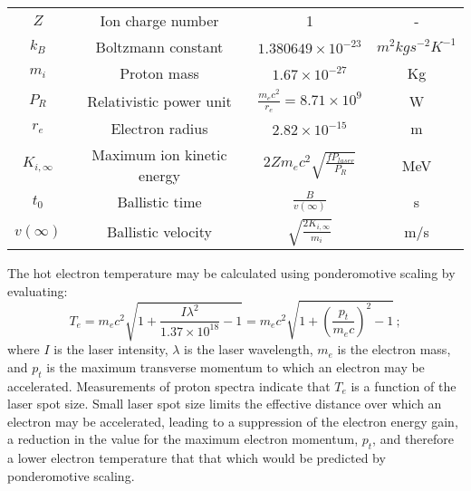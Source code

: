 \begin{table}
\begin{center}
\begin{tabular}{c c c c}
      $Z$ & Ion charge number & 1 & - \\  
      $k_{B}$ & Boltzmann constant & $1.380649 \times 10^{-23}$ & $m^{2} kg s^{-2} K^{-1}$ \\  
      $m_{i}$ & Proton mass & $1.67 \times 10^{-27}$ & Kg \\ 
      $P_{R}$ & Relativistic power unit & $\frac{m_{e} c^{2}}{r_{e}} = 8.71 \times 10^{9}$ & W \\  
      $r_{e}$ & Electron radius & $2.82 \times 10^{-15}$ & m \\  
      $K_{i,\infty}$ & Maximum ion kinetic energy & $2 Z m_{e} c^{2} \sqrt{\frac{f P_{laser}}{P_{R}}}$ & MeV \\  
      $t_{0}$ & Ballistic time & $\frac{B}{v(\infty)}$ & s \\  
      $v(\infty)$ & Ballistic velocity & $\sqrt{\frac{2 K_{i,\infty}}{m_{i}}}$ & m/s \\  
      \hline
    \end{tabular}
  \end{center}
\end{table}

The hot electron temperature may be calculated using ponderomotive
scaling by evaluating:
\begin{equation}
  T_e = m_{e} c^{2} \sqrt{1 + \frac{I \lambda^{2}}{1.37 \times 10^{18}} -1}
      = m_{e} c^{2} \sqrt{1 + \left(\frac{p_t}{m_e c}\right)^2 -1} \,
      ;
  \label{Eq:ElectronTemp}
\end{equation}
where $I$ is the laser intensity, $\lambda$ is the laser wavelength,
$m_e$ is the electron mass, and $p_t$ is the maximum transverse
momentum to which an electron may be accelerated.
Measurements of proton spectra indicate that $T_e$ is a function of
the laser spot size.
Small laser spot size limits the effective distance over which an
electron may be accelerated, leading to a suppression of the electron
energy gain, a reduction in the value for the maximum electron
momentum, $p_t$, and therefore a lower electron temperature that that
which would be predicted by ponderomotive scaling.

